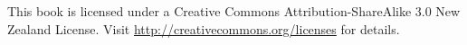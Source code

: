 \newpage
This book is licensed under a Creative
Commons Attribution-ShareAlike 3.0 New Zealand License.
Visit \url{http://creativecommons.org/licenses} for details.

